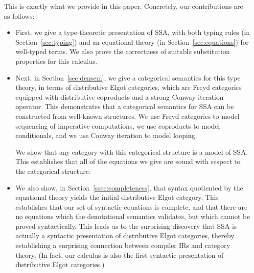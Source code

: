 \documentclass[acmsmall,screen,review]{acmart}
\newcounter{todos}
\newcommand{\todo}[1]{\stepcounter{todos} \textcolor{red}{\textbf{TODO \arabic{todos}}: #1}}
\begin{document}
%

This is exactly what we provide in this paper. Concretely, our contributions are as follows: 

\begin{itemize}
\item First, we give a type-theoretic presentation of SSA, with both typing rules (in
  Section~\ref{sec:typing}) and an equational theory (in Section~\ref{sec:equations}) for
  well-typed terms. We also prove the correctness of suitable substitution properties for this
  calculus. 
  
\item Next, in Section~\ref{sec:densem}, we give a categorical semantics for this type theory, in
  terms of distributive Elgot categories, which are Freyd categories equipped with distributive
  coproducts and a strong Conway iteration operator. This demonstrates that a categorical semantics
  for SSA can be constructed from well-known structures. We use Freyd categories to model sequencing of
  imperative computations,  we use coproducts to model conditionals, and we use Conway iteration to model
  looping. 

  We show that any category with this categorical structure is a model of SSA. This establishes that all of
  the equations we give are sound with respect to the categorical structure.

\item We also show, in Section~\ref{ssec:completeness}, that syntax quotiented by the equational
  theory yields the initial distributive Elgot category. This establishes that our set of syntactic
  equations is complete, and that there are no equations which the denotational semantics validates,
  but which cannot be proved syntactically. This leads us to the surprising discovery that SSA is actually
  a syntactic presentation of distributive Elgot categories, thereby establishing a surprising connection
  between compiler IRs and category theory. (In fact, our calculus is also the first syntactic presentation
  of distributive Elgot categories.) 


\end{itemize}
\end{document}
